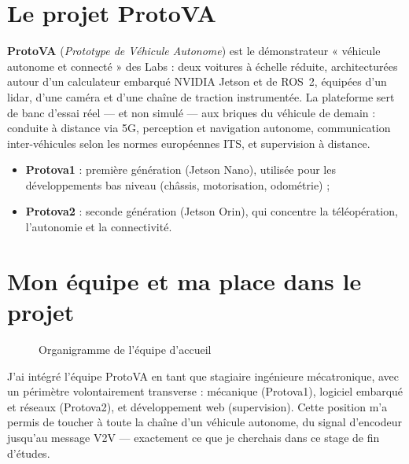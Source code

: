 \section{Le projet ProtoVA}

\textbf{ProtoVA} (\emph{Prototype de Véhicule Autonome}) est le démonstrateur
« véhicule autonome et connecté » des Labs : deux voitures à échelle réduite,
architecturées autour d'un calculateur embarqué NVIDIA Jetson et de ROS~2,
équipées d'un lidar, d'une caméra et d'une chaîne de traction instrumentée.
La plateforme sert de banc d'essai réel --- et non simulé --- aux briques du
véhicule de demain : conduite à distance via 5G, perception et navigation
autonome, communication inter-véhicules selon les normes européennes ITS, et
supervision à distance.

\begin{itemize}
  \item \textbf{Protova1} : première génération (Jetson Nano), utilisée pour
  les développements bas niveau (châssis, motorisation, odométrie) ;
  \item \textbf{Protova2} : seconde génération (Jetson Orin), qui concentre la
  téléopération, l'autonomie et la connectivité.
\end{itemize}

\section{Mon équipe et ma place dans le projet}

\begin{figure}[ht]
  \centering
  \caption{Organigramme de l'équipe d'accueil}
\end{figure}

J'ai intégré l'équipe ProtoVA en tant que stagiaire ingénieure mécatronique,
avec un périmètre volontairement transverse : mécanique (Protova1), logiciel
embarqué et réseaux (Protova2), et développement web (supervision). Cette
position m'a permis de toucher à toute la chaîne d'un véhicule autonome, du
signal d'encodeur jusqu'au message V2V --- exactement ce que je cherchais dans
ce stage de fin d'études.
